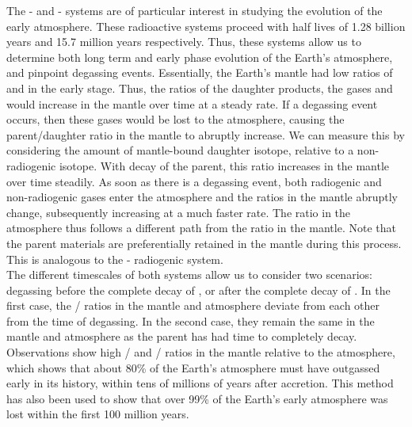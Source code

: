 \documentclass[10pt]{article}
\begin{document}
        The - and - systems are of particular interest in studying the evolution of the early atmosphere.
        These radioactive systems proceed with half lives of \SI{1.28}{} billion years and \SI{15.7}{} million years respectively.
        Thus, these systems allow us to determine both long term and early phase evolution of the Earth's atmosphere, and pinpoint
        degassing events. Essentially, the Earth's mantle had low ratios of  and  in the early stage.
        Thus, the ratios of the daughter products, the gases  and  would increase in the mantle over time at a steady rate.
        If a degassing event occurs, then these gases would be lost to the atmosphere, causing the parent/daughter ratio in the mantle
        to abruptly increase. We can measure this by considering the amount of mantle-bound daughter isotope, relative to a non-radiogenic isotope.
        With decay of the parent, this ratio increases in the mantle over time steadily. As soon as there is a degassing event, both
        radiogenic and non-radiogenic gases enter the atmosphere and the ratios in the mantle abruptly change, subsequently increasing at a much
        faster rate. The ratio in the atmosphere thus follows a different path from the ratio in the mantle.
        Note that the parent materials are preferentially retained in the mantle during this process. This is analogous to 
        the - radiogenic system. \\

        The different timescales of both systems allow us to consider two scenarios: degassing before the complete decay of ,
        or after the complete decay of . In the first case, the / ratios in the mantle and atmosphere
        deviate from each other from the time of degassing. In the second case, they remain the same in the mantle and atmosphere as
        the parent has had time to completely decay. Observations show high / and /
        ratios in the mantle relative to the atmosphere, which shows that about 80\% of the Earth's atmosphere must have outgassed
        early in its history, within tens of millions of years after accretion. This method has also been used to show that
        over 99\% of the Earth's early atmosphere was lost within the first \SI{100}{} million years.
\end{document}
